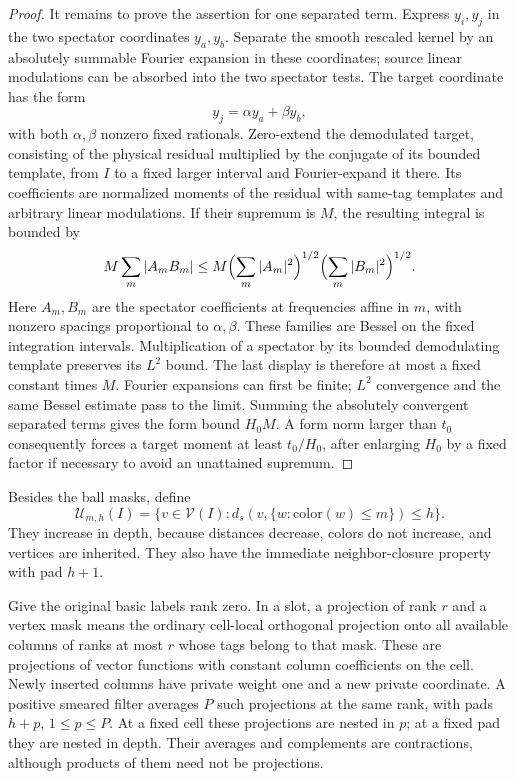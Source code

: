 \begin{proof}
It remains to prove the assertion for one separated term.  Express
$y_i,y_j$ in the two spectator coordinates $y_a,y_b$.  Separate the
smooth rescaled kernel by an absolutely summable Fourier expansion in
these coordinates; source linear modulations can be absorbed into the
two spectator tests.  The target coordinate has the form
\[
 y_j=\alpha y_a+\beta y_b,
\]
with both $\alpha,\beta$ nonzero fixed rationals.  Zero-extend the
demodulated target, consisting of the physical residual multiplied by
the conjugate of its bounded template, from $I$ to a fixed larger
interval and Fourier-expand it there.  Its coefficients are normalized
moments of the residual with same-tag templates and arbitrary linear
modulations.  If their supremum is $M$, the resulting integral is
bounded by
\[
 M\sum_m|A_mB_m|
 \le M\Bigl(\sum_m|A_m|^2\Bigr)^{1/2}
         \Bigl(\sum_m|B_m|^2\Bigr)^{1/2}.
\]
Here $A_m,B_m$ are the spectator coefficients at frequencies affine in
$m$, with nonzero spacings proportional to $\alpha,\beta$.
These families are Bessel on the fixed integration intervals.
Multiplication of a spectator by its bounded demodulating template
preserves its $L^2$ bound.  The last display is therefore at most a
fixed constant times $M$.  Fourier expansions can first be finite;
$L^2$ convergence and the same Bessel estimate pass to the limit.
Summing the absolutely convergent separated terms gives the form bound
$H_0M$.  A form norm larger than $t_0$ consequently forces a target
moment at least $t_0/H_0$, after enlarging $H_0$ by a fixed factor if
necessary to avoid an unattained supremum.
\end{proof}

Besides the ball masks, define
\[
 \mathcal U_{m,h}(I)=
 \{v\in\mathcal V(I):d_s(v,\{w:\text{color}(w)\le m\})\le h\}.
\]
They increase in depth, because distances decrease, colors do not
increase, and vertices are inherited.  They also have the immediate
neighbor-closure property with pad $h+1$.

Give the original basic labels rank zero.  In a slot, a projection of
rank $r$ and a vertex mask means the ordinary cell-local orthogonal
projection onto all available columns of ranks at most $r$ whose tags
belong to that mask.  These are projections of vector functions with
constant column coefficients on the cell.  Newly inserted columns have
private weight one and a new private coordinate.  A positive smeared
filter averages $P$ such projections at the same rank, with pads
$h+p$, $1\le p\le P$.  At a fixed cell these projections are nested
in $p$; at a fixed pad they are nested in depth.  Their averages and
complements are contractions, although products of them need not be
projections.

